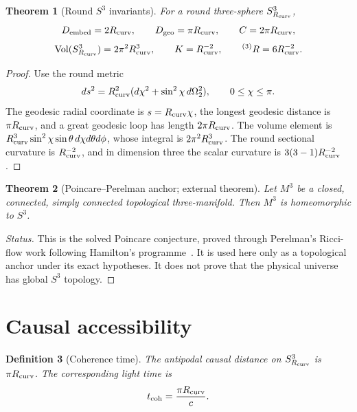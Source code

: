 \documentclass[11pt,a4paper]{article}
\newtheorem{theorem}{Theorem}[section]
\newtheorem{definition}[theorem]{Definition}
\newcommand{\Vol}{\operatorname{Vol}}
\begin{document}
\begin{theorem}[Round $S^3$ invariants]
For a round three-sphere $S^3_{R_{\rm curv}}$,
\[
D_{\rm embed}=2R_{\rm curv},\qquad
D_{\rm geo}=\pi R_{\rm curv},\qquad
C=2\pi R_{\rm curv},
\]
\[
\Vol(S^3_{R_{\rm curv}})=2\pi^2R_{\rm curv}^3,\qquad
K=R_{\rm curv}^{-2},\qquad
{}^{(3)}R=6R_{\rm curv}^{-2}.
\]
\end{theorem}
\begin{proof}
Use the round metric
\[
ds^2=R_{\rm curv}^2(d\chi^2+\sin^2\chi\,d\Omega_2^2),
\qquad 0\le\chi\le\pi.
\]
The geodesic radial coordinate is $s=R_{\rm curv}\chi$, the longest geodesic distance is $\pi R_{\rm curv}$, and a great geodesic loop has length $2\pi R_{\rm curv}$.  The volume element is $R_{\rm curv}^3\sin^2\chi\sin\theta\,d\chi d\theta d\phi$, whose integral is $2\pi^2R_{\rm curv}^3$.  The round sectional curvature is $R_{\rm curv}^{-2}$, and in dimension three the scalar curvature is $3(3-1)R_{\rm curv}^{-2}$.
\end{proof}

\begin{theorem}[Poincare--Perelman anchor; external theorem]
Let $M^3$ be a closed, connected, simply connected topological three-manifold.  Then $M^3$ is homeomorphic to $S^3$.
\end{theorem}
\begin{proof}[Status]
This is the solved Poincare conjecture, proved through Perelman's Ricci-flow work following Hamilton's programme~\cite{Perelman2002,Perelman2003}.  It is used here only as a topological anchor under its exact hypotheses.  It does not prove that the physical universe has global $S^3$ topology.
\end{proof}

\section{Causal accessibility}
\label{sec:causal-accessibility}

\begin{definition}[Coherence time]
The antipodal causal distance on $S^3_{R_{\rm curv}}$ is $\pi R_{\rm curv}$.  The corresponding light time is
\[
t_{\rm coh}=\frac{\pi R_{\rm curv}}{c}.
\]
\end{definition}
\end{document}
